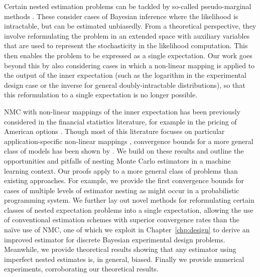 Certain nested estimation problems can be tackled by so-called pseudo-marginal methods
\citep{beaumont2003estimation,andrieu2009pseudo,andrieu2010particle,
	andrieu2015convergence,andersson2015nested}.
These consider cases of Bayesian inference where the likelihood is intractable, 
but can be estimated unbiasedly.
From a theoretical perspective, they involve reformulating the problem in an extended space with auxiliary variables that
are used to represent the stochasticity in the likelihood computation. This then enables the
problem to be expressed as a single expectation.
Our work goes beyond this by also considering cases in which a non-linear mapping is
applied to the output of the inner expectation (such as the logarithm in the 
experimental design case or the inverse for general doubly-intractable distributions), so that 
this reformulation to a single expectation is no longer possible.

NMC with non-linear mappings of the inner expectation has been previously considered in
the financial statistics literature, for example in the pricing of American
options \citep{longstaff2001valuing}. Though most of this literature focuses on
particular application-specific non-linear mappings \citep{broadie2011efficient,gordy2010nested},
convergence bounds for a more general class of models
has been shown by \citet{hong2009estimating}.
We build on these results and outline the opportunities and pitfalls of nesting Monte Carlo
estimators in a machine learning context.
Our proofs apply to a more general class of problems than existing approaches.
For example, we provide the first convergence bounds for cases of multiple levels of estimator nesting
as might occur in a probabilistic programming system.
We further lay out novel methods for reformulating certain classes of nested expectation problems
into a single expectation, allowing the use of conventional \mc estimation 
schemes with superior convergence rates than the na\"{i}ve use of NMC, one of which we
exploit in Chapter~\ref{chp:design} to derive an improved estimator for discrete
Bayesian experimental design problems.
Meanwhile, we provide theoretical results showing that any \mc
estimator using imperfect nested estimates is, in general, biased.  Finally we provide numerical
experiments, corroborating our theoretical results.



